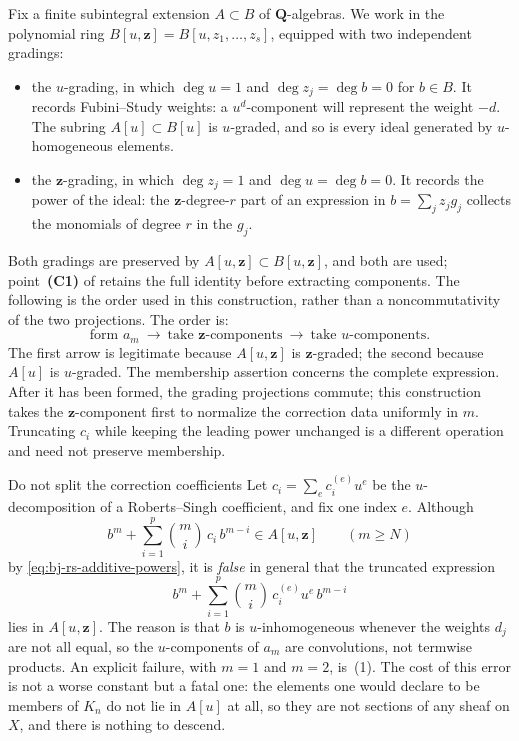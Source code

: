 Fix a finite subintegral extension $A\subset B$ of
$\mathbf Q$-algebras.  We work in the polynomial ring
$B[u,\mathbf z]=B[u,z_1,\ldots,z_s]$, equipped with two independent
gradings:
\begin{itemize}
\item the $u$-grading, in which $\deg u=1$ and $\deg z_j=\deg b=0$
      for $b\in B$.  It records Fubini--Study weights: a $u^d$-component
      will represent the weight $-d$.  The subring $A[u]\subset B[u]$
      is $u$-graded, and so is every ideal generated by
      $u$-homogeneous elements.
\item the $\mathbf z$-grading, in which $\deg z_j=1$ and
      $\deg u=\deg b=0$.  It records the power of the ideal: the
      $\mathbf z$-degree-$r$ part of an expression in
      $b=\sum_jz_jg_j$ collects the monomials of degree $r$ in the
      $g_j$.
\end{itemize}
Both gradings are preserved by $A[u,\mathbf z]\subset B[u,\mathbf z]$, and
both are used; point~\textbf{(C1)} of  retains the full identity
before extracting components.  The following is the order used in this
construction, rather than a noncommutativity of the two projections.  The order is:
\[
 \boxed{\ \text{form }a_m\ \longrightarrow\
 \text{take }\mathbf z\text{-components}\ \longrightarrow\
 \text{take }u\text{-components}.\ }
\]
The first arrow is legitimate because $A[u,\mathbf z]$ is
$\mathbf z$-graded; the second because $A[u]$ is $u$-graded.  The membership assertion concerns the complete expression.
After it has been formed, the grading projections commute; this
construction takes the $\mathbf z$-component first to normalize the
correction data uniformly in $m$.  Truncating $c_i$ while keeping the
leading power unchanged is a different operation and need not preserve
membership.

\begin{warning}{Do not split the correction coefficients}
\label{warn:ch44-no-splitting}
Let $c_i=\sum_ec_i^{(e)}u^e$ be the $u$-decomposition of a
Roberts--Singh coefficient, and fix one index $e$.  Although
\[
 b^m+\sum_{i=1}^p\binom mi\,c_i\,b^{m-i}\in A[u,\mathbf z]
 \qquad(m\ge N)
\]
by \eqref{eq:bj-rs-additive-powers}, it is \emph{false} in general that the
truncated expression
\[
 b^m+\sum_{i=1}^p\binom mi\,c_i^{(e)}u^e\,b^{m-i}
\]
lies in $A[u,\mathbf z]$.  The reason is that $b$ is $u$-inhomogeneous
whenever the weights $d_j$ are not all equal, so the $u$-components of
$a_m$ are convolutions, not termwise products.  An explicit failure, with
$m=1$ and $m=2$, is \Cref{ex:ch44-splitting-fails}\,(1).  The cost of
this error is not a worse constant but a fatal one: the elements one would
declare to be members of $K_n$ do not lie in $A[u]$ at all, so they are
not sections of any sheaf on $X$, and there is nothing to descend.
\end{warning}

